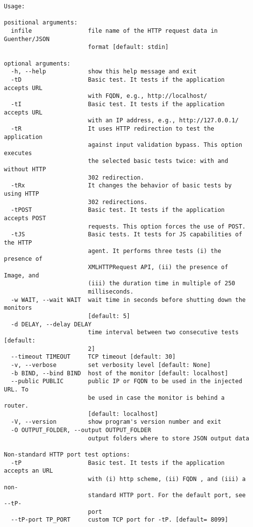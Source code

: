 \documentclass[10pt,a4paper]{article}
\begin{document}
\begin{verbatim}
Usage:

positional arguments:
  infile                file name of the HTTP request data in Guenther/JSON
                        format [default: stdin]

optional arguments:
  -h, --help            show this help message and exit
  -tD                   Basic test. It tests if the application accepts URL
                        with FQDN, e.g., http://localhost/
  -tI                   Basic test. It tests if the application accepts URL
                        with an IP address, e.g., http://127.0.0.1/
  -tR                   It uses HTTP redirection to test the application
                        against input validation bypass. This option executes
                        the selected basic tests twice: with and without HTTP
                        302 redirection.
  -tRx                  It changes the behavior of basic tests by using HTTP
                        302 redirections.
  -tPOST                Basic test. It tests if the application accepts POST
                        requests. This option forces the use of POST.
  -tJS                  Basic tests. It tests for JS capabilities of the HTTP
                        agent. It performs three tests (i) the presence of
                        XMLHTTPRequest API, (ii) the presence of Image, and
                        (iii) the duration time in multiple of 250
                        milliseconds.
  -w WAIT, --wait WAIT  wait time in seconds before shutting down the monitors
                        [default: 5]
  -d DELAY, --delay DELAY
                        time interval between two consecutive tests [default:
                        2]
  --timeout TIMEOUT     TCP timeout [default: 30]
  -v, --verbose         set verbosity level [default: None]
  -b BIND, --bind BIND  host of the monitor [default: localhost]
  --public PUBLIC       public IP or FQDN to be used in the injected URL. To
                        be used in case the monitor is behind a router.
                        [default: localhost]
  -V, --version         show program's version number and exit
  -O OUTPUT_FOLDER, --output OUTPUT_FOLDER
                        output folders where to store JSON output data

Non-standard HTTP port test options:
  -tP                   Basic test. It tests if the application accepts an URL
                        with (i) http scheme, (ii) FQDN , and (iii) a non-
                        standard HTTP port. For the default port, see --tP-
                        port
  --tP-port TP_PORT     custom TCP port for -tP. [default= 8099]


\end{verbatim}
\end{document}
